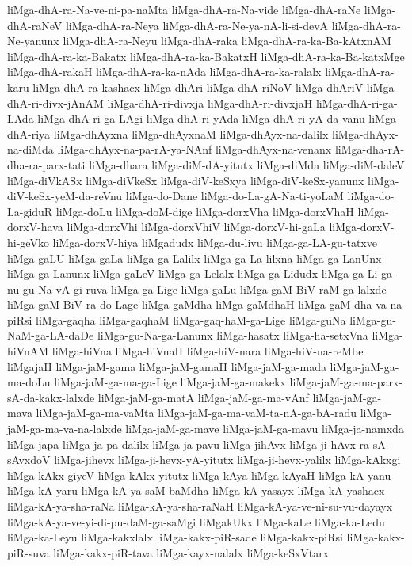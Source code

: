 {liMga-dhA-ra-Na-ve-ni-pa-naMta
liMga-dhA-ra-Na-vide
liMga-dhA-raNe
liMga-dhA-raNeV
liMga-dhA-ra-Neya
liMga-dhA-ra-Ne-ya-nA-li-si-devA
liMga-dhA-ra-Ne-yanunx
liMga-dhA-ra-Neyu
liMga-dhA-raka
liMga-dhA-ra-ka-Ba-kAtxnAM
liMga-dhA-ra-ka-Bakatx
liMga-dhA-ra-ka-BakatxH
liMga-dhA-ra-ka-Ba-katxMge
liMga-dhA-rakaH
liMga-dhA-ra-ka-nAda
liMga-dhA-ra-ka-ralalx
liMga-dhA-ra-karu
liMga-dhA-ra-kashacx
liMga-dhAri
liMga-dhA-riNoV
liMga-dhAriV
liMga-dhA-ri-divx-jAnAM
liMga-dhA-ri-divxja
liMga-dhA-ri-divxjaH
liMga-dhA-ri-ga-LAda
liMga-dhA-ri-ga-LAgi
liMga-dhA-ri-yAda
liMga-dhA-ri-yA-da-vanu
liMga-dhA-riya
liMga-dhAyxna
liMga-dhAyxnaM
liMga-dhAyx-na-dalilx
liMga-dhAyx-na-diMda
liMga-dhAyx-na-pa-rA-ya-NAnf
liMga-dhAyx-na-venanx
liMga-dha-rA-dha-ra-parx-tati
liMga-dhara
liMga-diM-dA-yitutx
liMga-diMda
liMga-diM-daleV
liMga-diVkASx
liMga-diVkeSx
liMga-diV-keSxya
liMga-diV-keSx-yanunx
liMga-diV-keSx-yeM-da-reVnu
liMga-do-Dane
liMga-do-La-gA-Na-ti-yoLaM
liMga-do-La-giduR
liMga-doLu
liMga-doM-dige
liMga-dorxVha
liMga-dorxVhaH
liMga-dorxV-hava
liMga-dorxVhi
liMga-dorxVhiV
liMga-dorxV-hi-gaLa
liMga-dorxV-hi-geVko
liMga-dorxV-hiya
liMgadudx
liMga-du-livu
liMga-ga-LA-gu-tatxve
liMga-gaLU
liMga-gaLa
liMga-ga-Lalilx
liMga-ga-La-lilxna
liMga-ga-LanUnx
liMga-ga-Lanunx
liMga-gaLeV
liMga-ga-Lelalx
liMga-ga-Lidudx
liMga-ga-Li-ga-nu-gu-Na-vA-gi-ruva
liMga-ga-Lige
liMga-gaLu
liMga-gaM-BiV-raM-ga-lalxde
liMga-gaM-BiV-ra-do-Lage
liMga-gaMdha
liMga-gaMdhaH
liMga-gaM-dha-va-na-piRsi
liMga-gaqha
liMga-gaqhaM
liMga-gaq-haM-ga-Lige
liMga-guNa
liMga-gu-NaM-ga-LA-daDe
liMga-gu-Na-ga-Lanunx
liMga-hasatx
liMga-ha-setxVna
liMga-hiVnAM
liMga-hiVna
liMga-hiVnaH
liMga-hiV-nara
liMga-hiV-na-reMbe
liMgajaH
liMga-jaM-gama
liMga-jaM-gamaH
liMga-jaM-ga-mada
liMga-jaM-ga-ma-doLu
liMga-jaM-ga-ma-ga-Lige
liMga-jaM-ga-makekx
liMga-jaM-ga-ma-parx-sA-da-kakx-lalxde
liMga-jaM-ga-matA
liMga-jaM-ga-ma-vAnf
liMga-jaM-ga-mava
liMga-jaM-ga-ma-vaMta
liMga-jaM-ga-ma-vaM-ta-nA-ga-bA-radu
liMga-jaM-ga-ma-va-na-lalxde
liMga-jaM-ga-mave
liMga-jaM-ga-mavu
liMga-ja-namxda
liMga-japa
liMga-ja-pa-dalilx
liMga-ja-pavu
liMga-jihAvx
liMga-ji-hAvx-ra-sA-sAvxdoV
liMga-jihevx
liMga-ji-hevx-yA-yitutx
liMga-ji-hevx-yalilx
liMga-kAkxgi
liMga-kAkx-giyeV
liMga-kAkx-yitutx
liMga-kAya
liMga-kAyaH
liMga-kA-yanu
liMga-kA-yaru
liMga-kA-ya-saM-baMdha
liMga-kA-yasayx
liMga-kA-yashacx
liMga-kA-ya-sha-raNa
liMga-kA-ya-sha-raNaH
liMga-kA-ya-ve-ni-su-vu-dayayx
liMga-kA-ya-ve-yi-di-pu-daM-ga-saMgi
liMgakUkx
liMga-kaLe
liMga-ka-Ledu
liMga-ka-Leyu
liMga-kakxlalx
liMga-kakx-piR-sade
liMga-kakx-piRsi
liMga-kakx-piR-suva
liMga-kakx-piR-tava
liMga-kayx-nalalx
liMga-keSxVtarx
}
